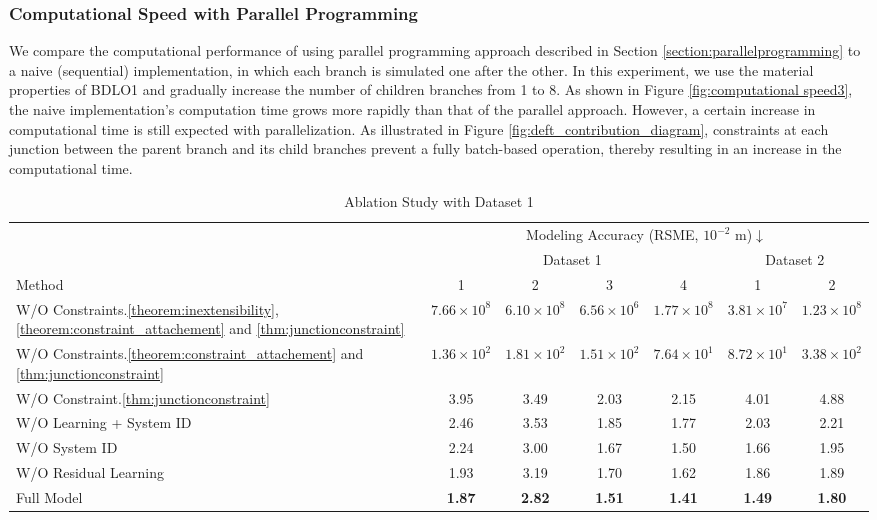 \subsubsection{Computational Speed with Parallel Programming}
We compare the computational performance of using parallel programming approach described in Section \ref{section:parallelprogramming} to a naive (sequential) implementation, in which each branch is simulated one after the other. 
In this experiment, we use the material properties of BDLO1 and gradually increase the number of children branches from 1 to 8. 
As shown in Figure \ref{fig:computational speed3}, the naive implementation’s computation time grows more rapidly than that of the parallel approach.
However, a certain increase in computational time is still expected with parallelization. 
As illustrated in Figure \ref{fig:deft_contribution_diagram}, constraints at each junction between the parent branch and its child branches prevent a fully batch-based operation, thereby resulting in an increase in the computational time.
\begin{table*}[t]
    \centering
    \caption{Ablation Study with Dataset 1}
    \begin{tabular}{l||cccc|cc}
        \toprule
        & \multicolumn{6}{c}{Modeling Accuracy (RSME, $10^{-2}$ m)$\downarrow$}  \\ 
        & \multicolumn{4}{c|}{Dataset 1}& \multicolumn{2}{c}{Dataset 2}  \\ 
        Method & 1 & 2 & 3 & 4  & 1 & 2 \\
        \hline 
        W/O Constraints.\ref{theorem:inextensibility}, \ref{theorem:constraint_attachement} and \ref{thm:junctionconstraint} & $7.66\times10^8$ & $6.10\times 10^8$ & $6.56\times 10^6$ & $1.77\times10^8$ & $3.81\times 10^7$ & $1.23\times10^8$\\
        W/O Constraints.\ref{theorem:constraint_attachement} and \ref{thm:junctionconstraint} & $1.36 \times 10^2$ & $1.81 \times 10^2$& $1.51\times10^2$ & $7.64 \times 10^1$ & $8.72\times10^1$ & $3.38\times10^2$\\
        W/O Constraint.\ref{thm:junctionconstraint} & 3.95 & 3.49 & 2.03 & 2.15 & 4.01 & 4.88\\
        W/O Learning + System ID & 2.46 & 3.53 & 1.85 & 1.77 & 2.03 & 2.21\\
        W/O System ID & 2.24 & 3.00 & 1.67 & 1.50 & 1.66 & 1.95\\
        W/O Residual Learning & 1.93 & 3.19 & 1.70 & 1.62 & 1.86 & 1.89\\        
        Full Model & \textbf{1.87} &  \textbf{2.82} &  \textbf{1.51} &  \textbf{1.41} & \textbf{1.49} &  \textbf{1.80}\\
        \bottomrule
    \end{tabular}
    \label{tab:ablation}
\end{table*}

